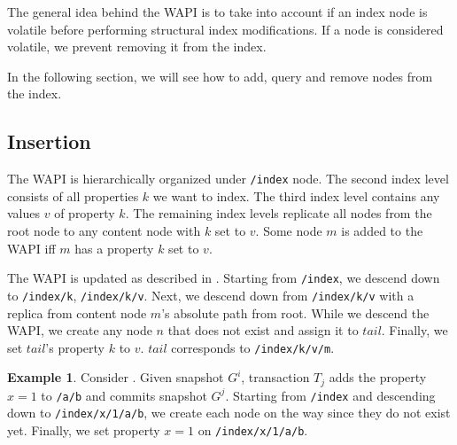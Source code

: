 \documentclass[abstracton,12pt]{scrartcl}
\theoremstyle{definition}
\newtheorem{example}{Example}
\begin{document}
The general idea behind the WAPI is to take into account if an index node is volatile before performing structural index modifications.
If a node is considered volatile, we prevent removing it from the index.

In the following section, we will see how to add, query and remove nodes from the index.

\subsection{Insertion}

The WAPI is hierarchically organized under \texttt{/index} node.
The second index level consists of all properties $k$ we want to index.
The third index level contains any values $v$ of property $k$.
The remaining index levels replicate all nodes from the root node to any content node with $k$ set to $v$.
Some node $m$ is added to the WAPI iff $m$ has a property $k$ set to $v$.

The WAPI is updated as described in .
Starting from \texttt{/index}, we descend down to \texttt{/index/k}, \texttt{/index/k/v}.
Next, we descend down from \texttt{/index/k/v} with a replica from content node $m$'s absolute path from root.
While we descend the WAPI, we create any node $n$ that does not exist and assign it to $tail$.
Finally, we set $tail$'s property $k$ to $v$. $tail$ corresponds to \texttt{/index/k/v/m}.

\begin{example}
    Consider .
    Given snapshot $G^i$, transaction $T_j$ adds the property $x=1$ to \texttt{/a/b} and commits snapshot $G^j$.
    Starting from \texttt{/index} and descending down to \texttt{/index/x/1/a/b}, we create each node on the way since they do not exist yet.
    Finally, we set property $x=1$ on \texttt{/index/x/1/a/b}.
\end{example}
\end{document}
